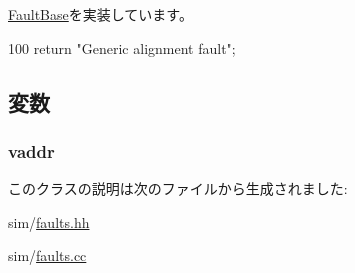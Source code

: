 \hyperlink{classFaultBase_aad960357563b8b969d2dffdcc6861de7}{FaultBase}を実装しています。


\begin{DoxyCode}
100 {return "Generic alignment fault";}
\end{DoxyCode}


\subsection{変数}
\hypertarget{classGenericAlignmentFault_a9f933b300ef63eea367ca82f8da31025}{
\subsubsection[{vaddr}]{ {\bf vaddr}}}
\label{classGenericAlignmentFault_a9f933b300ef63eea367ca82f8da31025}


このクラスの説明は次のファイルから生成されました:\begin{DoxyCompactItemize}
\item 
sim/\hyperlink{sim_2faults_8hh}{faults.hh}\item 
sim/\hyperlink{sim_2faults_8cc}{faults.cc}\end{DoxyCompactItemize}

